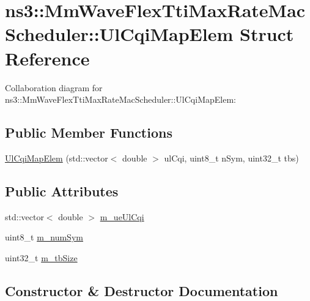 \hypertarget{structns3_1_1MmWaveFlexTtiMaxRateMacScheduler_1_1UlCqiMapElem}{}\section{ns3\+:\+:Mm\+Wave\+Flex\+Tti\+Max\+Rate\+Mac\+Scheduler\+:\+:Ul\+Cqi\+Map\+Elem Struct Reference}
\label{structns3_1_1MmWaveFlexTtiMaxRateMacScheduler_1_1UlCqiMapElem}


Collaboration diagram for ns3\+:\+:Mm\+Wave\+Flex\+Tti\+Max\+Rate\+Mac\+Scheduler\+:\+:Ul\+Cqi\+Map\+Elem\+:
\subsection*{Public Member Functions}
\begin{DoxyCompactItemize}
\item 
\hyperlink{structns3_1_1MmWaveFlexTtiMaxRateMacScheduler_1_1UlCqiMapElem_a4c6d4c58d4961da99a24476e11280af3}{Ul\+Cqi\+Map\+Elem} (std\+::vector$<$ double $>$ ul\+Cqi, uint8\+\_\+t n\+Sym, uint32\+\_\+t tbs)
\end{DoxyCompactItemize}
\subsection*{Public Attributes}
\begin{DoxyCompactItemize}
\item 
std\+::vector$<$ double $>$ \hyperlink{structns3_1_1MmWaveFlexTtiMaxRateMacScheduler_1_1UlCqiMapElem_ad1e0141d05277f9266de6952c69334cb}{m\+\_\+ue\+Ul\+Cqi}
\item 
uint8\+\_\+t \hyperlink{structns3_1_1MmWaveFlexTtiMaxRateMacScheduler_1_1UlCqiMapElem_a08473246ca9b53f05b17041eaef3433b}{m\+\_\+num\+Sym}
\item 
uint32\+\_\+t \hyperlink{structns3_1_1MmWaveFlexTtiMaxRateMacScheduler_1_1UlCqiMapElem_a96cfd4cb52ee5ab17f9fb795495704cd}{m\+\_\+tb\+Size}
\end{DoxyCompactItemize}


\subsection{Constructor \& Destructor Documentation}

